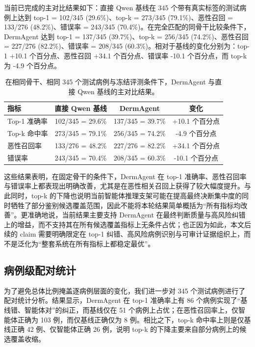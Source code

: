 \documentclass{article}
\begin{document}
当前已完成的主对比结果如下：直接 Qwen 基线在 345 个带有真实标签的测试病例上达到 top-1 = 102/345 (29.6\%)、top-k = 273/345 (79.1\%)、恶性召回 = 133/276 (48.2\%)、错误率 = 243/345 (70.4\%)。在完全匹配的同骨干比较条件下，DermAgent 达到 top-1 = 137/345 (39.7\%)、top-k = 256/345 (74.2\%)、恶性召回 = 227/276 (82.2\%)、错误率 = 208/345 (60.3\%)。相对于基线的变化分别为：top-1 +10.1 个百分点、恶性召回 +34.1 个百分点、错误率 -10.1 个百分点，而 top-k 为 -4.9 个百分点。

\begin{table}[t]
\centering
\caption{在相同骨干、相同 345 个测试病例与冻结评测条件下，DermAgent 与直接 Qwen 基线的主对比结果。}
\label{tab:main_results}
\small
\begin{tabular}{lccc}
\toprule
指标 & 直接 Qwen 基线 & DermAgent & 变化 \\
\midrule
Top-1 准确率 & 102/345 = 29.6\% & 137/345 = 39.7\% & +10.1 个百分点 \\
Top-k 命中率 & 273/345 = 79.1\% & 256/345 = 74.2\% & -4.9 个百分点 \\
恶性召回率 & 133/276 = 48.2\% & 227/276 = 82.2\% & +34.1 个百分点 \\
错误率 & 243/345 = 70.4\% & 208/345 = 60.3\% & -10.1 个百分点 \\
\bottomrule
\end{tabular}
\end{table}

这些结果表明，在固定骨干的条件下，DermAgent 在 top-1 准确率、恶性召回率与错误率上都表现出明确改善，尤其是在恶性相关召回上获得了较大幅度提升。与此同时，top-k 的下降也说明当前智能体推理支架可能在提高最终决断集中度的同时牺牲了部分鉴别候选覆盖范围，因此不能将本轮结果简单概括为“所有指标均改善”。更准确地说，当前结果主要支持 DermAgent 在最终判断质量与高风险纠错上的增益，而不支持其在所有候选覆盖指标上无条件占优；也正因为如此，本文后续的 claim 需要明确限定在 top-1 纠错、高风险病例识别与可审计证据组织上，而不是泛化为“整套系统在所有指标上都稳定最优”。

\subsection{病例级配对统计}

为了避免总体比例掩盖逐病例层面的变化，我们进一步对 345 个测试病例进行了配对统计分析。结果显示，DermAgent 在 top-1 准确率上有 86 个病例实现了“基线错、智能体对”的纠正，而基线仅在 51 个病例上占优；在恶性召回率上，仅智能体正确为 103 例，而仅基线正确仅为 8 例。相比之下，top-k 命中率上则是仅基线正确 42 例、仅智能体正确 26 例，说明 top-k 的下降主要来自部分病例上的候选覆盖收缩。
\end{document}
